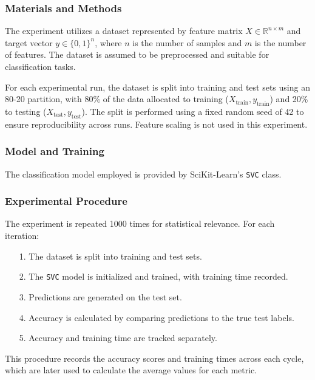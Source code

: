 \documentclass{article}
\theoremstyle{plain}
\theoremstyle{definition}
\theoremstyle{remark}
\begin{document}
\subsubsection{Materials and Methods}

The experiment utilizes a dataset represented by feature matrix $ X \in \mathbb{R}^{n \times m} $ and target vector $ y \in \{0, 1\}^n $, where $ n $ is the number of samples and $ m $ is the number of features. The dataset is assumed to be preprocessed and suitable for classification tasks.

For each experimental run, the dataset is split into training and test sets using an 80-20 partition, with 80\% of the data allocated to training ($ X_{\text{train}}, y_{\text{train}} $) and 20\% to testing ($ X_{\text{test}}, y_{\text{test}} $). The split is performed using a fixed random seed of 42 to ensure reproducibility across runs. Feature scaling is not used in this experiment.


\subsubsection{Model and Training}

The classification model employed is provided by SciKit-Learn's \texttt{SVC} class.


\subsubsection{Experimental Procedure}

The experiment is repeated 1000 times for statistical relevance. For each iteration:

\begin{itemize}
	\item [1.] The dataset is split into training and test sets.
	\item [2.] The \texttt{SVC} model is initialized and trained, with training time recorded.
	\item [3.] Predictions are generated on the test set.
	\item [4.] Accuracy is calculated by comparing predictions to the true test labels.
	\item [5.] Accuracy and training time are tracked separately.
\end{itemize}

This procedure records the accuracy scores and training times across each cycle, which are later used to calculate the average values for each metric.
\end{document}
